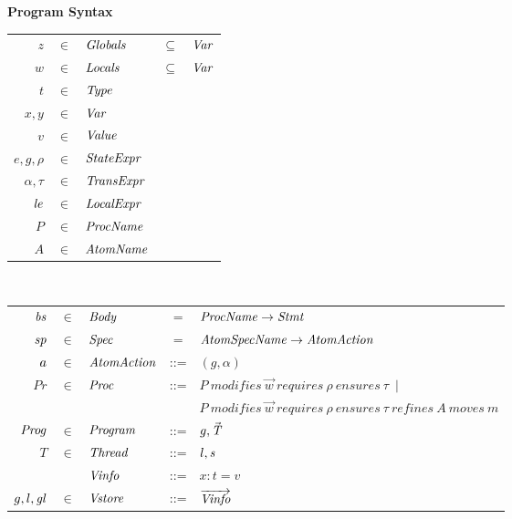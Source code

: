 

\begin{figure}
\setlength{\tabcolsep}{3pt}
{\bf Program Syntax} \\
\begin{tabular}{rclcl}
$z$ & $\in$ & $\mathit{Globals}$ & $\subseteq$ &$\mathit{Var}$ \\
$w$ & $\in$ & $\mathit{Locals}$ & $\subseteq$ & $\mathit{Var}$ \\
$t$ & $\in$ & $\mathit{Type}$ \\
$x,y$ & $\in$ & $\mathit{Var}$ \\
$v$ &  $\in$ & $\mathit{Value}$ \\
$e, g, \rho$ & $\in$ & $\mathit{StateExpr}$ \\
$\alpha, \tau$ & $\in$ & $\mathit{TransExpr}$ \\
$\mathit{le}$ & $\in$ & $\mathit{LocalExpr}$ \\
$P$ & $\in$ & $\mathit{ProcName}$ \\
$A$ & $\in$ & $\mathit{AtomName}$ \\
\end{tabular}\\
\begin{tabular}{rclcl}
$\mathit{bs}$ & $\in$ & $\mathit{Body}$ & = & $\mathit{ProcName} \rightarrow \mathit{Stmt}$ \\
$\mathit{sp}$ & $\in$ & $\mathit{Spec}$ & = & $\mathit{AtomSpecName} \rightarrow \mathit{AtomAction}$ \\
$\mathit{a}$ & $\in$ & $\mathit{AtomAction}$ & ::= & $(g, \alpha)\ $ \\
$Pr$ & $\in$ & $\mathit{Proc}$ &::= & $P\ \mathit{modifies}\ \overrightarrow{w}\ 
                                                        \mathit{requires}\ \rho\
                                                        \mathit{ensures}\ \tau\ \mid $\\
& & & & $P\ \mathit{modifies}\ \overrightarrow{w}\ 
                     \mathit{requires}\ \rho\
                     \mathit{ensures}\ \tau\
                     \mathit{refines}\ A\
                     \mathit{moves}\ m$\\
$\mathit{Prog}$ & $\in$ & $\mathit{Program}$ & ::= & $g, \vec{\mathit{T}}$ \\
$T$ & $\in$ & $\mathit{Thread}$ & ::=  & $l, \mathit{s}$ \\
&&$\mathit{Vinfo}$ & ::= & $x:t=v$ \\
$g,l,\mathit{gl}$ & $\in$ & $\mathit{Vstore}$ & ::= & $\overrightarrow{\mathit{Vinfo}}$ \\

\end{tabular}
\end{figure}
